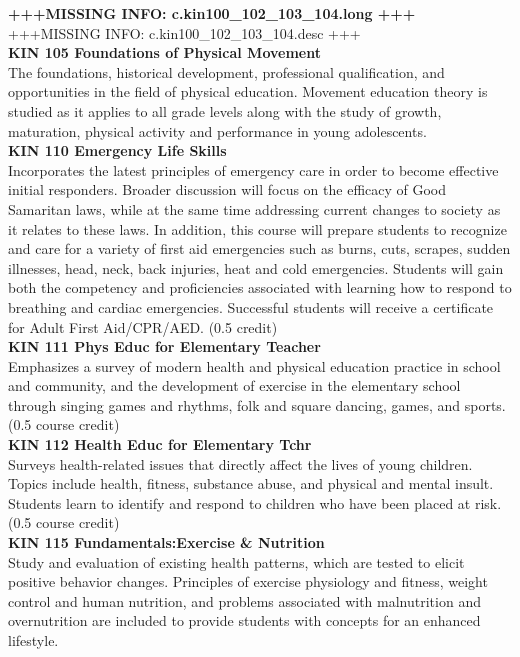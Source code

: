 \documentclass[
  letterpaper,
]{scrbook}
\begin{document}
\textbf{+++MISSING INFO: c.kin100\_102\_103\_104.long +++}\\
+++MISSING INFO: c.kin100\_102\_103\_104.desc +++\\
\textbf{KIN 105 Foundations of Physical Movement}\\
The foundations, historical development, professional qualification, and
opportunities in the field of physical education. Movement education
theory is studied as it applies to all grade levels along with the study
of growth, maturation, physical activity and performance in young
adolescents.\\
\textbf{KIN 110 Emergency Life Skills}\\
Incorporates the latest principles of emergency care in order to become
effective initial responders. Broader discussion will focus on the
efficacy of Good Samaritan laws, while at the same time addressing
current changes to society as it relates to these laws. In addition,
this course will prepare students to recognize and care for a variety of
first aid emergencies such as burns, cuts, scrapes, sudden illnesses,
head, neck, back injuries, heat and cold emergencies. Students will gain
both the competency and proficiencies associated with learning how to
respond to breathing and cardiac emergencies. Successful students will
receive a certificate for Adult First Aid/CPR/AED. (0.5 credit)\\
\textbf{KIN 111 Phys Educ for Elementary Teacher}\\
Emphasizes a survey of modern health and physical education practice in
school and community, and the development of exercise in the elementary
school through singing games and rhythms, folk and square dancing,
games, and sports. (0.5 course credit)\\
\textbf{KIN 112 Health Educ for Elementary Tchr}\\
Surveys health-related issues that directly affect the lives of young
children. Topics include health, fitness, substance abuse, and physical
and mental insult. Students learn to identify and respond to children
who have been placed at risk. (0.5 course credit)\\
\textbf{KIN 115 Fundamentals:Exercise \& Nutrition}\\
Study and evaluation of existing health patterns, which are tested to
elicit positive behavior changes. Principles of exercise physiology and
fitness, weight control and human nutrition, and problems associated
with malnutrition and overnutrition are included to provide students
with concepts for an enhanced lifestyle.\\
\end{document}
